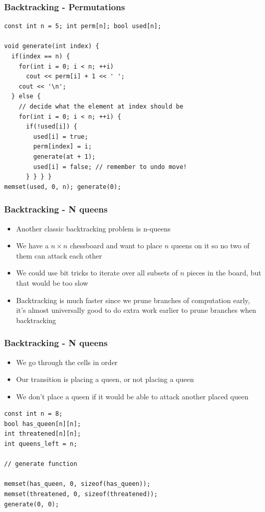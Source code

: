 \documentclass{beamer}
\begin{document}
\begin{frame}
	\frametitle{Backtracking - Permutations}
	\begin{small}
	\begin{verbatim}
const int n = 5; int perm[n]; bool used[n];

void generate(int index) {
  if(index == n) {
    for(int i = 0; i < n; ++i)
      cout << perm[i] + 1 << ' ';
    cout << '\n';
  } else {
    // decide what the element at index should be
    for(int i = 0; i < n; ++i) {
      if(!used[i]) {
        used[i] = true;
        perm[index] = i;
        generate(at + 1);
        used[i] = false; // remember to undo move!
      } } } }
memset(used, 0, n); generate(0);
	\end{verbatim}
	\end{small}
\end{frame}

\begin{frame}[plain]
	\frametitle{Backtracking - N queens}
	\begin{itemize}
		 \item Another classic backtracking problem is n-queens
		 \item We have a $n \times n$ chessboard and want to place $n$ queens on it so no two of them can attack each other
		 \item We could use bit tricks to iterate over all subsets of $n$ pieces in the board, but that would be too slow
		 \item Backtracking is much faster since we prune branches of computation early, it's almost universally good to do extra work earlier to prune branches when backtracking
	\end{itemize}
\end{frame}

\begin{frame}
	\frametitle{Backtracking - N queens}
	\begin{itemize}
		 \item We go through the cells in order
		 \item Our transition is placing a queen, or not placing a queen
		 \item We don't place a queen if it would be able to attack another placed queen
	\end{itemize}
	\begin{small}
	\begin{verbatim}
const int n = 8;
bool has_queen[n][n];
int threatened[n][n];
int queens_left = n;

// generate function

memset(has_queen, 0, sizeof(has_queen));
memset(threatened, 0, sizeof(threatened));
generate(0, 0);
	\end{verbatim}
	\end{small}
\end{frame}
\end{document}
